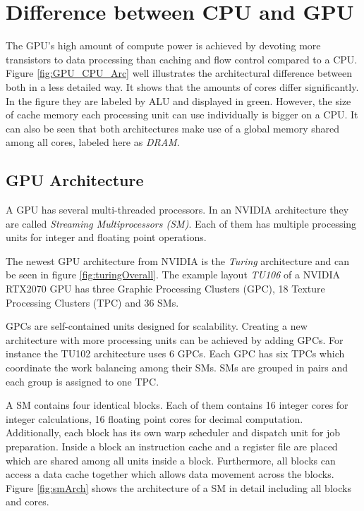 \section{Difference between CPU and GPU} 
  The GPU's high amount of compute power is achieved by devoting more transistors to data processing than caching and flow control compared to a CPU.
  Figure \ref{fig:GPU_CPU_Arc} well illustrates the architectural difference between both in a less detailed way.
  It shows that the amounts of cores differ significantly.
  In the figure they are labeled by ALU and displayed in green.
  However, the size of cache memory each processing unit can use individually is bigger on a CPU.
  It can also be seen that both architectures make use of a global memory shared among all cores, labeled here as \textit{DRAM}.~\cite{NVIDIA.2019}
  
  
\subsection{GPU Architecture}
\label{subsec:GPU_Arc}
  A GPU has several multi-threaded processors.
  In an NVIDIA architecture they are called \textit{Streaming Multiprocessors (SM)}.
  Each of them has multiple processing units for integer and floating point operations.~\cite{Rauber.2012}

  The newest GPU architecture from NVIDIA is the \textit{Turing} architecture and can be seen in figure \ref{fig:turingOverall}.
  The example layout \textit{TU106} of a NVIDIA RTX2070 GPU has three Graphic Processing Clusters (GPC), 18 Texture Processing Clusters (TPC) and 36 SMs.~\cite{NVIDIA.2018}
  	  
  GPCs are self-contained units designed for scalability.
  Creating a new architecture with more processing units can be achieved by adding GPCs.
  For instance the TU102 architecture uses 6 GPCs.
  Each GPC has six TPCs which coordinate the work balancing among their SMs.
  SMs are grouped in pairs and each group is assigned to one TPC.~\cite{Lindholm.2008}~\cite{NVIDIA.2018}
    
  A SM contains four identical blocks.
  Each of them contains 16 integer cores for integer calculations, 16 floating point cores for decimal computation. %
  Additionally, each block has its own warp scheduler and dispatch unit for job preparation.
  Inside a block an instruction cache and a register file are placed which are shared among all units inside a block.
  Furthermore, all blocks can access a data cache together which allows data movement across the blocks.
  Figure \ref{fig:smArch} shows the architecture of a SM in detail including all blocks and cores.~\cite{Burgess.2020}~\cite{NVIDIA.2018}

